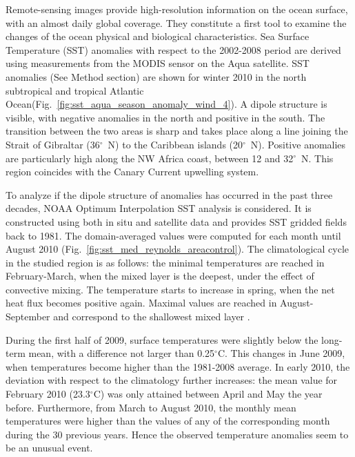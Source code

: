 \documentclass[12pt]{article}
\begin{document}
Remote-sensing images provide high-resolution information on the ocean surface, with an almost daily global coverage. They constitute a first tool to examine the changes of the ocean physical and biological characteristics. Sea Surface Temperature (SST) anomalies with respect to the 2002-2008 period are derived using measurements from the MODIS sensor on the Aqua satellite. SST anomalies (See Method section) are shown for winter 2010 in the north subtropical and tropical Atlantic Ocean(Fig.~\ref{fig:sst_aqua_season_anomaly_wind_4}). A dipole structure is visible, with negative anomalies in the north and positive in the south. The transition between the two areas is sharp and takes place along a line joining the Strait of Gibraltar (36$^{\circ}$~N) to the Caribbean islands (20$^{\circ}$~N). Positive anomalies are particularly high along the NW Africa coast, between 12 and 32$^{\circ}$~N. This region coincides with the Canary Current upwelling system. 

To analyze if the dipole structure of anomalies has occurred in the past three decades, NOAA Optimum Interpolation SST analysis \citep{REYNOLDS02} is considered. It is constructed using both in situ and satellite data and provides SST gridded fields back to 1981. The domain-averaged values were computed for each month until August 2010 (Fig.~\ref{fig:sst_med_reynolds_areacontrol}). The climatological cycle in the studied region is as follows: the minimal temperatures are reached in February-March, when the mixed layer is the deepest, under the effect of convective mixing. The temperature starts to increase in spring, when the net heat flux becomes positive again. Maximal values are reached in August-September and correspond to the shallowest mixed layer \citep[e.g.][]{TROUPIN10}. 

During the first half of 2009, surface temperatures were slightly below the long-term mean, with a difference not larger than 0.25$^{\circ}$C. This changes in June 2009, when temperatures become higher than the 1981-2008 average. In early 2010, the deviation with respect to the climatology  further increases: the mean value for February 2010 (23.3$^{\circ}$C) was only attained between April and May the year before. Furthermore, from March to August 2010, the monthly mean temperatures were higher than the values of any of the corresponding month during the 30 previous years. Hence the observed temperature anomalies seem to be an unusual event. 
\end{document}
